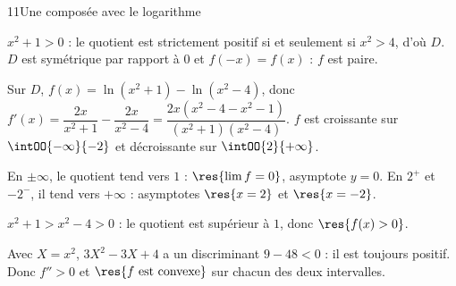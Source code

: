 \begin{corrige}{11}{Une composée avec le logarithme}
\noindent
\begin{minipage}[t]{0.56\linewidth}\vspace{0pt}\raggedright
\begin{questions}
  \item $x^{2}+1>0$ : le quotient est strictement positif si et seulement si $x^{2}>4$, d'où $D$. $D$ est symétrique par rapport à
    $0$ et $f(-x)=f(x)$ : $f$ est paire.
  \item Sur $D$, $f(x)=\ln\left(x^{2}+1\right)-\ln\left(x^{2}-4\right)$, donc
    $f'(x)=\dfrac{2x}{x^{2}+1}-\dfrac{2x}{x^{2}-4}=\dfrac{2x\left(x^{2}-4-x^{2}-1\right)}{\left(x^{2}+1\right)\left(x^{2}-4\right)}$.
    $f$ est croissante sur $\intOO{-\infty}{-2}$ et décroissante sur $\intOO{2}{+\infty}$.
  \item En $\pm\infty$, le quotient tend vers $1$ : $\res{\lim f=0}$, asymptote $y=0$. En $2^{+}$ et $-2^{-}$, il tend vers $+\infty$ :
    asymptotes $\res{x=2}$ et $\res{x=-2}$.
  \item $x^{2}+1>x^{2}-4>0$ : le quotient est supérieur à $1$, donc $\res{f(x)>0}$.
  \item Avec $X=x^{2}$, $3X^{2}-3X+4$ a un discriminant $9-48<0$ : il est toujours positif. Donc $f''>0$ et
    $\res{f\text{ est convexe}}$ sur chacun des deux intervalles.
\end{questions}
\end{minipage}\hfill
\begin{minipage}[t]{0.4\linewidth}\vspace{0pt}
\centering
{}\\[0.5mm]
\end{minipage}
\end{corrige}


